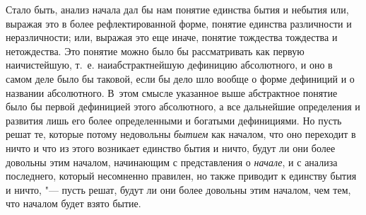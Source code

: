 Стало быть, анализ начала дал бы нам понятие единства бытия и небытия или,
выражая это в более рефлектированной форме, понятие единства различности и
неразличности; или, выражая это еще иначе, понятие тождества тождества и
нетождества.
Это понятие можно было бы рассматривать как первую наичистейшую, т.~е.
наиабстрактнейшую дефиницию абсолютного, и оно в самом деле было бы
таковой, если бы дело шло вообще о форме дефиниций и о названии
абсолютного. В~этом смысле указанное выше абстрактное понятие было бы
первой дефиницией этого абсолютного, а все дальнейшие определения и
развития лишь его более определенными и богатыми дефинициями. Но пусть
решат те, которые потому недовольны {\em бытием} как
началом, что оно переходит в ничто и что из этого возникает единство бытия
и ничто, будут ли они более довольны этим началом, начинающим с
представления о {\em начале}, и с анализа последнего,
который несомненно правилен, но также приводит к единству бытия и ничто, "---
пусть решат, будут ли они более довольны этим началом, чем тем, что началом
будет взято бытие.

